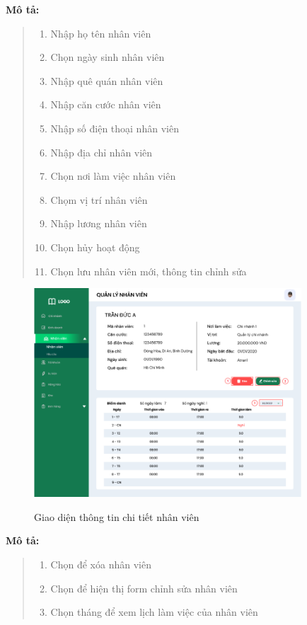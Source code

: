             \textbf{Mô tả:}  
            \begin{quote}
                \begin{enumerate}
                    \item Nhập họ tên nhân viên
                    \item Chọn ngày sinh nhân viên
                    \item Nhập quê quán nhân viên
                    \item Nhập căn cước nhân viên
                    \item Nhập số điện thoại nhân viên
                    \item Nhập địa chỉ nhân viên
                    \item Chọn nơi làm việc nhân viên
                    \item Chọm vị trí nhân viên
                    \item Nhập lương nhân viên
                    \item Chọn hủy hoạt động
                    \item Chọn lưu nhân viên mới, thông tin chỉnh sửa 
                \end{enumerate}
            \end{quote}
            \begin{figure}[!htp]
                \centering
                \includegraphics[width=10cm]{img/UI/admin/staff_detail.png}
                \label{25}
                \newline
                \caption{Giao diện thông tin chi tiết nhân viên}
            \end{figure}
            \textbf{Mô tả:}  
            \begin{quote}
                \begin{enumerate}
                    \item Chọn để xóa nhân viên
                    \item Chọn để hiện thị form chỉnh sửa nhân viên
                    \item Chọn tháng để xem lịch làm việc của nhân viên
                    
                \end{enumerate}
            \end{quote}
        
